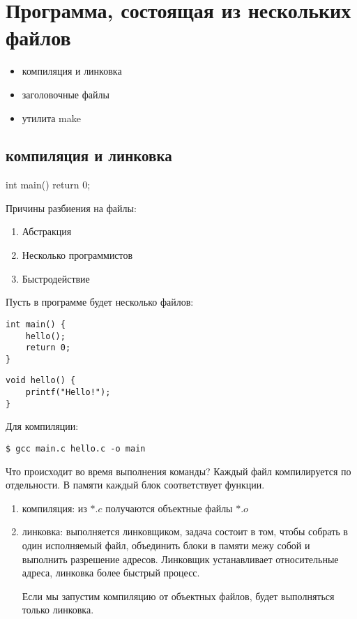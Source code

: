 % 
% 

\section{Программа, состоящая из нескольких файлов}
\begin{itemize}[noitemsep]
    \item компиляция и линковка
    \item заголовочные файлы
    \item утилита make
\end{itemize}
\subsection{компиляция и линковка}
\begin{ccode}
int main() {
    return 0;
}
\end{ccode}
Причины разбиения на файлы:
\begin{enumerate}[noitemsep]
    \item Абстракция
    \item Несколько программистов
    \item Быстродействие
\end{enumerate}
Пусть в программе будет несколько файлов:
\begin{verbatim}
int main() {
    hello();
    return 0;
}
\end{verbatim}
\begin{verbatim}
void hello() {
    printf("Hello!");
}
\end{verbatim}
Для компиляции:
\begin{verbatim}
$ gcc main.c hello.c -o main
\end{verbatim}
Что происходит во время выполнения команды? Каждый файл компилируется по отдельности.
В памяти каждый блок соответствует функции.
\begin{enumerate}[noitemsep]
    \item компиляция: из $*.c$ получаются объектные файлы $*.o$
    \item линковка: выполняется линковщиком, задача состоит в том, чтобы собрать в один исполняемый файл, объединить блоки в памяти межу собой и выполнить разрешение адресов.
	Линковщик устанавливает относительные адреса, линковка более быстрый процесс.

	Если мы запустим компиляцию от объектных файлов, будет выполняться только линковка.
\end{enumerate}

